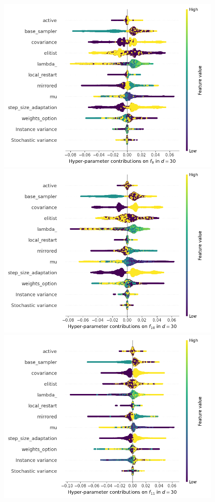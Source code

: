 \begin{figure}[t]
	\includegraphics[height=0.15\textheight,trim=0mm 0mm 30mm 0mm,clip]{cma_img_new/img_summary_f9_d30.png}
	\includegraphics[height=0.15\textheight,trim=60mm 0mm 30mm 0mm,clip]{cma_img_new/img_summary_f10_d30.png}
	\includegraphics[height=0.15\textheight,trim=60mm 0mm 30mm 0mm,clip]{cma_img_new/img_summary_f11_d30.png}

\end{figure}

